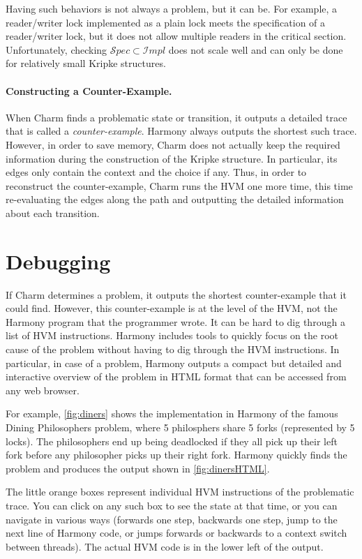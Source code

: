 \documentclass[twocolumn]{article}
\begin{document}
Having such behaviors is not always a problem, but it can be.  For
example, a reader/writer lock implemented as a plain lock meets the
specification of a reader/writer lock, but it does not allow multiple
readers in the critical section.  Unfortunately, checking ${\mathcal
Spec} \subset {\mathcal Impl}$ does not scale well and can only be
done for relatively small Kripke structures.

\paragraph{Constructing a Counter-Example.}

When Charm finds a problematic state or transition, it outputs
a detailed trace that is called a \emph{counter-example}.
Harmony always outputs the shortest such trace.
However, in order to save memory, Charm does not actually keep
the required information during the construction of the Kripke
structure.  In particular, its edges only contain the context
and the choice if any.  Thus, in order to reconstruct the
counter-example, Charm runs the HVM one more time, this time
re-evaluating the edges along the path and outputting the
detailed information about each transition.

\section{Debugging}

If Charm determines a problem, it outputs the shortest counter-example that
it could find.  However, this counter-example is at the level of the HVM,
not the Harmony program that the programmer wrote.  It can be hard to
dig through a list of HVM instructions.
Harmony includes tools to quickly focus on the root cause of the
problem without having to dig through the HVM instructions.
In particular, in case of a problem, Harmony outputs a compact
but detailed and interactive overview of the problem in HTML format that
can be accessed from any web browser.

For example, \autoref{fig:diners} shows the implementation
in Harmony of the famous Dining Philosophers problem, where 5 philosphers
share 5 forks (represented by 5 locks).
The philosophers end up being deadlocked
if they all pick up their left fork before any philosopher picks up
their right fork.
Harmony quickly finds the problem and produces the output
shown in \autoref{fig:dinersHTML}.

The little orange boxes represent individual HVM instructions of the
problematic trace.  You can click on any such box to see the state
at that time, or you can navigate in various ways (forwards one step,
backwards one step, jump to the next line of Harmony code, or jumps
forwards or backwards to a context switch between threads).  The actual
HVM code is in the lower left of the output.
\end{document}
